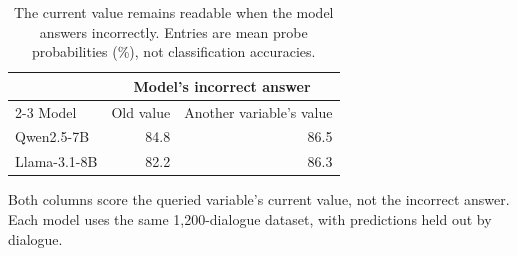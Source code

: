\begin{table}[htbp]
\centering
\small
\setlength{\tabcolsep}{7pt}
\caption{The current value remains readable when the model answers incorrectly.
Entries are mean probe probabilities (\%), not classification accuracies.}
\label{tab:current-value-probe}
\begin{tabularx}{\linewidth}{@{}Xrr@{}}
\toprule
 & \multicolumn{2}{c}{Model's incorrect answer} \\
\cmidrule(l){2-3}
Model & Old value & Another variable's value \\
\midrule
Qwen2.5-7B   & 84.8 & 86.5 \\
Llama-3.1-8B & 82.2 & 86.3 \\
\bottomrule
\end{tabularx}
\vspace{2pt}\parbox{\linewidth}{\footnotesize
Both columns score the queried variable's current value, not the incorrect
answer. Each model uses the same 1,200-dialogue dataset, with predictions
held out by dialogue.}
\end{table}

